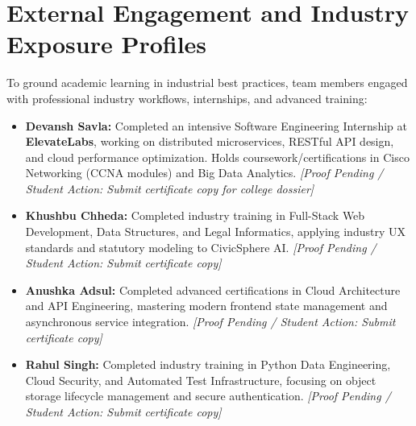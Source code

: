 \section{External Engagement and Industry Exposure Profiles}
\label{sec:external_engagement}
To ground academic learning in industrial best practices, team members engaged with professional industry workflows, internships, and advanced training:
\begin{itemize}
    \item \textbf{Devansh Savla:} Completed an intensive Software Engineering Internship at \textbf{ElevateLabs}, working on distributed microservices, RESTful API design, and cloud performance optimization. Holds coursework/certifications in Cisco Networking (CCNA modules) and Big Data Analytics. \textit{[Proof Pending / Student Action: Submit certificate copy for college dossier]}
    \item \textbf{Khushbu Chheda:} Completed industry training in Full-Stack Web Development, Data Structures, and Legal Informatics, applying industry UX standards and statutory modeling to CivicSphere AI. \textit{[Proof Pending / Student Action: Submit certificate copy]}
    \item \textbf{Anushka Adsul:} Completed advanced certifications in Cloud Architecture and API Engineering, mastering modern frontend state management and asynchronous service integration. \textit{[Proof Pending / Student Action: Submit certificate copy]}
    \item \textbf{Rahul Singh:} Completed industry training in Python Data Engineering, Cloud Security, and Automated Test Infrastructure, focusing on object storage lifecycle management and secure authentication. \textit{[Proof Pending / Student Action: Submit certificate copy]}
\end{itemize}
